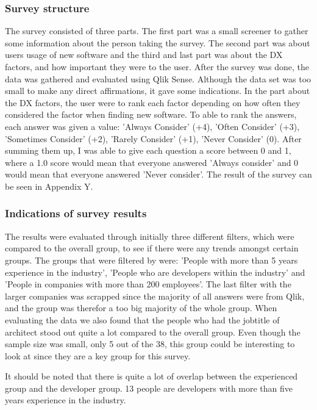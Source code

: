 \documentclass{article}
\begin{document}
\subsubsection{Survey structure}

The survey consisted of three parts. The first part was a small screener
to gather some information about the person taking the survey. The
second part was about users usage of new software and the third and last
part was about the DX factors, and how important they were to the user.
After the survey was done, the data was gathered and evaluated using
Qlik Sense. Although the data set was too small to make any direct
affirmations, it gave some indications. In the part about the DX
factors, the user were to rank each factor depending on how often they
considered the factor when finding new software. To able to rank the
answers, each answer was given a value: 'Always Consider' (+4), 'Often
Consider' (+3), 'Sometimes Consider' (+2), 'Rarely Consider' (+1),
'Never Consider' (0). After summing them up, I was able to give each
question a score between 0 and 1, where a 1.0 score would mean that
everyone answered 'Always consider' and 0 would mean that everyone
answered 'Never consider'. The result of the survey can be seen in
Appendix Y.

\subsubsection{Indications of survey results}

The results were evaluated through initially three different filters,
which were compared to the overall group, to see if there were any
trends amongst certain groups. The groups that were filtered by were:
'People with more than 5 years experience in the industry', 'People who
are developers within the industry' and 'People in companies with more
than 200 employees'. The last filter with the larger companies was
scrapped since the majority of all answers were from Qlik, and the group
was therefor a too big majority of the whole group. When evaluating the
data we also found that the people who had the jobtitle of architect
stood out quite a lot compared to the overall group. Even though the
sample size was small, only 5 out of the 38, this group could be
interesting to look at since they are a key group for this survey.

It should be noted that there is quite a lot of overlap between the
experienced group and the developer group. 13 people are developers with
more than five years experience in the industry.
\end{document}
